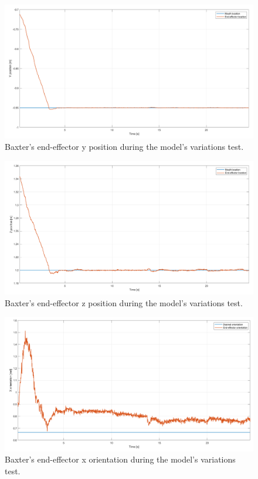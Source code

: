\documentclass[11pt]{report} %
\begin{document}
\begin{figure}[H]
    \centering
    \includegraphics[width=1.0\linewidth]{assets/imgs/control_theory/mpc_regulation_model_changed/y_pose.png}
    \caption{Baxter's end-effector y position during the model's variations test.} 
    \label{fig_baxter_y_pose_mpc_model_perturbations_experiments}
\end{figure}

\begin{figure}[H]
    \centering
    \includegraphics[width=1.0\linewidth]{assets/imgs/control_theory/mpc_regulation_model_changed/z_pose.png}
    \caption{Baxter's end-effector z position during the model's variations test.} 
    \label{fig_baxter_z_pose_mpc_model_perturbations_experiments}
\end{figure}

\begin{figure}[H]
    \centering
    \includegraphics[width=1.0\linewidth]{assets/imgs/control_theory/mpc_regulation_model_changed/x_orientation.png}
    \caption{Baxter's end-effector x orientation during the model's variations test.} 
    \label{fig_baxter_x_orientation_mpc_model_perturbations_experiments}
\end{figure}
\end{document}
